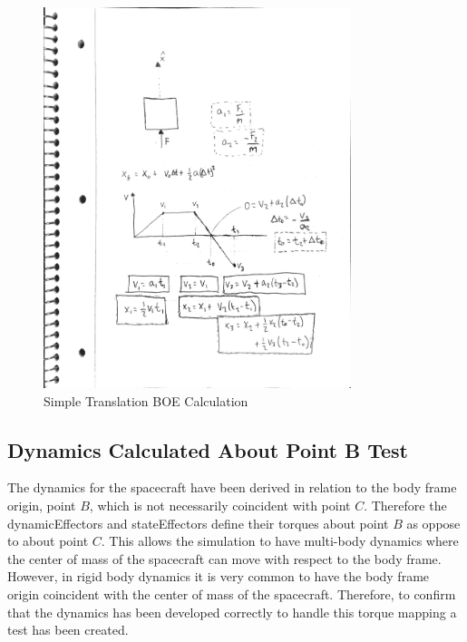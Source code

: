 \begin{figure}[htbp]
	\centerline{
		\includegraphics[width=0.8\textwidth]{Figures/TranslationBOE}}
	\caption{Simple Translation BOE Calculation}
	\label{fig:BOETrans}
\end{figure}

\clearpage

\subsection{Dynamics Calculated About Point B Test}

The dynamics for the spacecraft have been derived in relation to the body frame origin, point $B$, which is not necessarily coincident with point $C$. Therefore the dynamicEffectors and stateEffectors define their torques about point $B$ as oppose to about point $C$. This allows the simulation to have multi-body dynamics where the center of mass of the spacecraft can move with respect to the body frame. However, in rigid body dynamics it is very common to have the body frame origin coincident with the center of mass of the spacecraft. Therefore, to confirm that the dynamics has been developed correctly to handle this torque mapping a test has been created.

